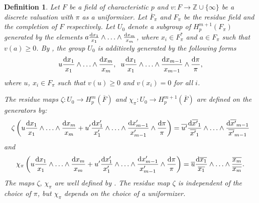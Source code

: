 \documentclass[times,10pt]{amsart}
\newcommand{\Z}{\ensuremath{\mathbb{Z}}}
\newcommand{\dd}{{\rm d}}
\newcommand{\n}{\ensuremath{\infty}}
\newtheorem{defn}[thm]{Definition}%
\begin{document}
{ \begin{defn}\label{defre}
          Let $F$ be a    field of characteristic $p$ and   {$v: F\xrightarrow{}\Z\cup\{\n\}$}  be a discrete valuation with   $\pi$ as a uniformizer. Let $\overline{F}_{\pi}$ and $ F_{\pi}$ be the residue field and the completion of $F$ respectively. Let $U_0$  denote a subgroup of $H_p^{m+1}( F_{\pi})$ generated by the elements  { $ a\frac{\dd x_1}{x_1}\wedge \ldots\wedge \frac{\dd x_m}{x_m}$}, where  $x_i\in F_{\pi}^*$ and $a\in F_{\pi}$ such that  $ v(a)\geq 0$.  By \cite[Theorem 2.5]{I},  the group $U_0$ is additively  generated by the following  forms $$ u \frac{\dd x_1}{x_1}\wedge \ldots\wedge \frac{\dd x_{m}}{x_m}, \hspace{2mm} u \frac{\dd x_1}{x_1}\wedge \ldots\wedge \frac{\dd x_{m-1}}{x_{m-1}}\wedge \frac{\dd \pi}{\pi}, $$ where  $u$, $ x_i\in F_{\pi}$ such that    $v(u)\geq 0$ and $v(x_i)=0$ for all $i$.\\
          \medskip

          
            {The residue maps $\zeta : U_0\xrightarrow{}  H_p^{m}(\overline{F})$ and $\chi_{\pi}: U_0\xrightarrow{} H_p^{m+1}( \overline{F})$ are defined  on the generators by}:  
     $$  \zeta \left( u \frac{\dd x_1}{x_1}\wedge \ldots\wedge \frac{\dd x_m}{x_m}+ u' \frac{\dd x'_1}{x'_1}\wedge \ldots\wedge \frac{\dd x'_{m-1}}{x'_{m-1}}\wedge \frac{\dd \pi}{\pi}\right)=  \overline{u'} \frac{\dd \overline{x'}_1}{\overline{x'}_1}\wedge\ldots\wedge \frac{\dd \overline{ x'}_{m-1}}{\overline{x'}_{m-1}}$$ and $$  \chi_{\pi}\left( u \frac{\dd x_1}{x_1}\wedge \ldots\wedge \frac{\dd x_m}{x_m}+ u' \frac{\dd x'_1}{x'_1}\wedge \ldots\wedge \frac{\dd x'_{m-1}}{x'_{m-1}}\wedge \frac{\dd \pi}{\pi}\right)= \overline{u} \frac{\dd \overline{x_1}}{\overline{x_1}}\wedge \ldots\wedge \frac{\overline{x_m}}{\overline{x_m}}.  $$  The maps $ \zeta$, $ \chi_{\pi}$ are well defined by \cite[Theorem 2.5]{Izhboldin}.   The residue map $\zeta$ is independent of the choice of $\pi$, but $\chi_{\pi}$ depends on the choice of a uniformizer.\\
     

\end{defn}}
\end{document}
